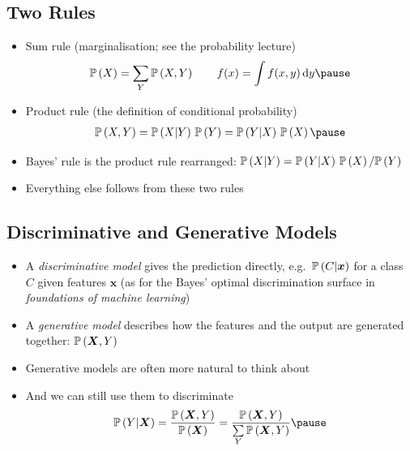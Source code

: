 
\begin{slide}
\section{Two Rules}

\begin{PauseHighLight}
  \begin{itemize}
  \item Sum rule (marginalisation; see the probability lecture)
    \begin{align*}
      \Prob{X} = \sum_Y \Prob{X,Y} \qquad
      f(x) = \int f(x,y)\,\dd y\pause
    \end{align*}
  \item Product rule (the definition of conditional probability)
    \begin{align*}
      \Prob{X,Y} = \Prob{X|Y}\,\Prob{Y} = \Prob{Y|X}\,\Prob{X}\pause
    \end{align*}
  \item Bayes' rule is the product rule rearranged:
    $\mathbb{P}\left( X|Y \right) = \mathbb{P}\left( Y|X \right)\,\mathbb{P}\left( X \right)/\mathbb{P}\left( Y \right)$\pause
  \item Everything else follows from these two rules\pause
  \end{itemize}
\end{PauseHighLight}

\end{slide}


\begin{slide}
\section[-1]{Discriminative and Generative Models}

\begin{PauseHighLight}
  \begin{itemize}
  \item A \emph{discriminative model} gives the prediction directly,
    e.g.\ $\mathbb{P}\left( C|\bm{x} \right)$ for a class $C$ given features $\bm{x}$\pause{}
    (as for the Bayes' optimal discrimination surface in
    \textit{foundations of machine learning})\pauseb
  \item A \emph{generative model} describes how the features and the
    output are generated together: $\mathbb{P}\left( \bm{X},Y \right)$\pause
  \item Generative models are often more natural to think about\pause
  \item And we can still use them to discriminate
    \begin{align*}
      \Prob{Y|\bm{X}} = \frac{\Prob{\bm{X},Y}}{\Prob{\bm{X}}}
      = \frac{\Prob{\bm{X},Y}}{\sum\limits_Y \Prob{\bm{X}, Y}}\pause
    \end{align*}
  \end{itemize}
\end{PauseHighLight}

\end{slide}


